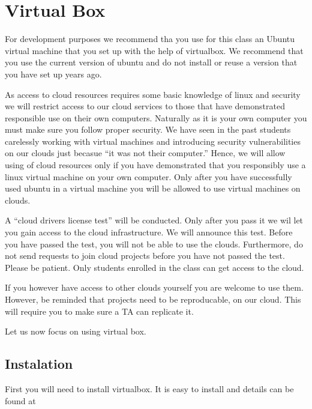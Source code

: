 \chapter{Virtual Box}
\label{S:virtual-box}

\FILENAME

For development purposes we recommend tha you use for this class an
Ubuntu virtual machine that you set up with the help of virtualbox. We
recommend that you use the current version of ubuntu and do not
install or reuse a version that you have set up years ago.

As access to cloud resources requires some basic knowledge of linux
and security we will restrict access to our cloud services to those
that have demonstrated responsible use on their own
computers. Naturally as it is your own computer you must make sure you
follow proper security. We have seen in the past students carelessly
working with virtual machines and introducing security vulnerabilities
on our clouds just becasue ``it was not their computer.'' Hence, we
will allow using of cloud resources only if you have demonstrated that
you responsibly use a linux virtual machine on your own computer.
Only after you have successfully used ubuntu in a virtual machine you
will be allowed to use virtual machines on clouds.

A ``cloud drivers license test'' will be conducted. Only after you
pass it we wil let you gain access to the cloud infrastructure. We
will announce this test. Before you have passed the test, you will
not be able to use the clouds.  Furthermore, do not send requests to 
join cloud projects before you have not passed the
test. Please be patient. Only students enrolled in the class can get
access to the cloud. 

If you however have access to other clouds yourself you are welcome to
use them. However, be reminded that projects need to be reproducable,
on our cloud. This will require you to make sure a TA can replicate it.

Let us now focus on using virtual box.

\section{Instalation}\label{creation}

First you will need to install virtualbox. It is easy to install and
details can be found at


